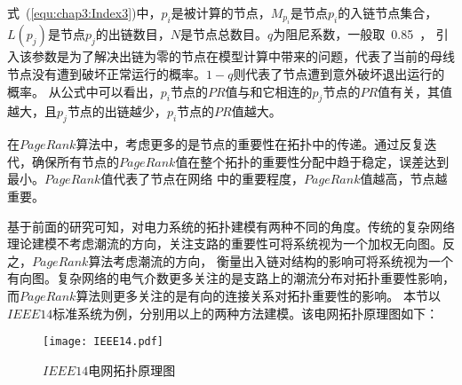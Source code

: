 式~(\ref{equ:chap3:Index3})中，$p_i$是被计算的节点，$M_{p_i}$是节点$p_i$的入链节点集合，$L(p_j)$是节点$p_j$的出链数目，$N$是节点总数目。$q$为阻尼系数，一般取~0.85~，
引入该参数是为了解决出链为零的节点在模型计算中带来的问题，代表了当前的母线节点没有遭到破坏正常运行的概率。$1-q$则代表了节点遭到意外破坏退出运行的概率。
从公式中可以看出，$p_i$节点的$PR$值与和它相连的$p_j$节点的$PR$值有关，其值越大，且$p_j$节点的出链越少，$p_i$节点的$PR$值越大。

在$PageRank$算法中，考虑更多的是节点的重要性在拓扑中的传递。通过反复迭代，确保所有节点的$PageRank$值在整个拓扑的重要性分配中趋于稳定，误差达到最小。$PageRank$值代表了节点在网络
中的重要程度，$PageRank$值越高，节点越重要。

基于前面的研究可知，对电力系统的拓扑建模有两种不同的角度。传统的复杂网络理论建模不考虑潮流的方向，关注支路的重要性可将系统视为一个加权无向图。反之，$PageRank$算法考虑潮流的方向，
衡量出入链对结构的影响可将系统视为一个有向图。复杂网络的电气介数更多关注的是支路上的潮流分布对拓扑重要性影响，而$PageRank$算法则更多关注的是有向的连接关系对拓扑重要性的影响。
本节以$IEEE14$标准系统为例，分别用以上的两种方法建模。该电网拓扑原理图如下：
\begin{figure}[H] %
  \centering
  \texttt{[image: IEEE14.pdf]}
  \caption{$IEEE14$电网拓扑原理图}
  \label{fig:fundement14}
\end{figure}

